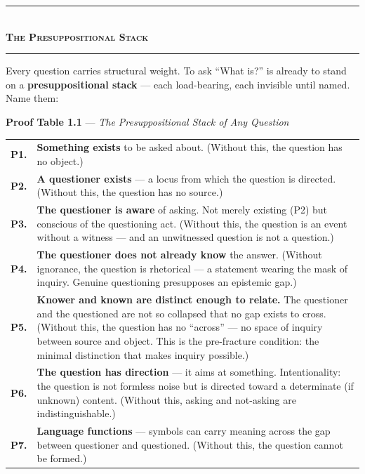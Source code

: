 \documentclass[10pt, openany, oneside]{book}
\renewcommand{\normalsize}{\fontsize{10}{13}\selectfont}
\renewcommand{\footnotesize}{\fontsize{8.5}{11}\selectfont}
\begin{document}
\begin{center}
    \rule{0.3\textwidth}{0.4pt}\\[0.5em]
    {\normalsize\bfseries\scshape The Presuppositional Stack}\\[0.3em]
    \rule{0.3\textwidth}{0.4pt}
\end{center}

\vspace{1em}

Every question carries structural weight. To ask ``What is?'' is already to stand on a \textbf{presuppositional stack} --- each load-bearing, each invisible until named. Name them:

\vspace{0.8em}

\textbf{Proof Table 1.1} --- \textit{The Presuppositional Stack of Any Question}

\vspace{0.5em}

{\footnotesize
\noindent\begin{tabular}{r p{}}
\textbf{P1.} & \textbf{Something exists} to be asked about. (Without this, the question has no object.) \\[0.3em]
\textbf{P2.} & \textbf{A questioner exists} --- a locus from which the question is directed. (Without this, the question has no source.) \\[0.3em]
\textbf{P3.} & \textbf{The questioner is aware} of asking. Not merely existing (P2) but conscious of the questioning act. (Without this, the question is an event without a witness --- and an unwitnessed question is not a question.) \\[0.3em]
\textbf{P4.} & \textbf{The questioner does not already know} the answer. (Without ignorance, the question is rhetorical --- a statement wearing the mask of inquiry. Genuine questioning presupposes an epistemic gap.) \\[0.3em]
\textbf{P5.} & \textbf{Knower and known are distinct enough to relate.} The questioner and the questioned are not so collapsed that no gap exists to cross. (Without this, the question has no ``across'' --- no space of inquiry between source and object. This is the pre-fracture condition: the minimal distinction that makes inquiry possible.) \\[0.3em]
\textbf{P6.} & \textbf{The question has direction} --- it aims at something. Intentionality: the question is not formless noise but is directed toward a determinate (if unknown) content. (Without this, asking and not-asking are indistinguishable.) \\[0.3em]
\textbf{P7.} & \textbf{Language functions} --- symbols can carry meaning across the gap between questioner and questioned. (Without this, the question cannot be formed.) \\[0.3em]
\end{tabular}
}
\end{document}
